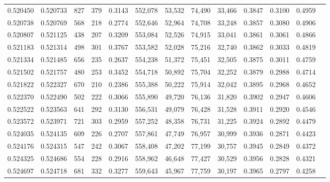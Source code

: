 \begin{tabular}{rrrrrrrrrrrrr}
0.520450 & 0.520733 &    827 &   379 &                                     0.3143 & 552,078 &  53,532 &  74,490 &  33,466 & 0.3847 & 0.3100 & 0.4959 \\
0.520738 & 0.520769 &    568 &   218 &                                     0.2774 & 552,646 &  52,964 &  74,708 &  33,248 & 0.3857 & 0.3080 & 0.4906 \\
0.520807 & 0.521125 &    438 &   207 &                                     0.3209 & 553,084 &  52,526 &  74,915 &  33,041 & 0.3861 & 0.3061 & 0.4866 \\
0.521183 & 0.521314 &    498 &   301 &                                     0.3767 & 553,582 &  52,028 &  75,216 &  32,740 & 0.3862 & 0.3033 & 0.4819 \\
0.521334 & 0.521485 &    656 &   235 &                                     0.2637 & 554,238 &  51,372 &  75,451 &  32,505 & 0.3875 & 0.3011 & 0.4759 \\
0.521502 & 0.521757 &    480 &   253 &                                     0.3452 & 554,718 &  50,892 &  75,704 &  32,252 & 0.3879 & 0.2988 & 0.4714 \\
0.521822 & 0.522327 &    670 &   210 &                                     0.2386 & 555,388 &  50,222 &  75,914 &  32,042 & 0.3895 & 0.2968 & 0.4652 \\
0.522370 & 0.522490 &    502 &   222 &                                     0.3066 & 555,890 &  49,720 &  76,136 &  31,820 & 0.3902 & 0.2947 & 0.4606 \\
0.522522 & 0.523563 &    641 &   292 &                                     0.3130 & 556,531 &  49,079 &  76,428 &  31,528 & 0.3911 & 0.2920 & 0.4546 \\
0.523572 & 0.523971 &    721 &   303 &                                     0.2959 & 557,252 &  48,358 &  76,731 &  31,225 & 0.3924 & 0.2892 & 0.4479 \\
0.524035 & 0.524135 &    609 &   226 &                                     0.2707 & 557,861 &  47,749 &  76,957 &  30,999 & 0.3936 & 0.2871 & 0.4423 \\
0.524176 & 0.524315 &    547 &   242 &                                     0.3067 & 558,408 &  47,202 &  77,199 &  30,757 & 0.3945 & 0.2849 & 0.4372 \\
0.524325 & 0.524686 &    554 &   228 &                                     0.2916 & 558,962 &  46,648 &  77,427 &  30,529 & 0.3956 & 0.2828 & 0.4321 \\
0.524697 & 0.524718 &    681 &   332 &                                     0.3277 & 559,643 &  45,967 &  77,759 &  30,197 & 0.3965 & 0.2797 & 0.4258 \\

\end{tabular}
